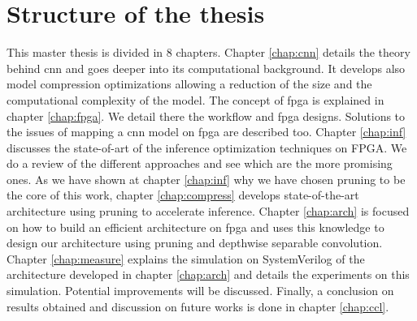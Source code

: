 \section*{Structure of the thesis}
This master thesis is divided in 8 chapters. \newline \newline
%
Chapter \ref{chap:cnn} details the theory behind \acrshort{cnn} and goes deeper into its computational background. It develops also model compression optimizations allowing a reduction of the size and the computational complexity of the model. \newline \newline
%
The concept of \acrshort{fpga} is explained in chapter \ref{chap:fpga}. We detail there the workflow and \acrshort{fpga} designs. Solutions to the issues of mapping a \acrshort{cnn} model on \acrshort{fpga} are described too. \newline \newline
%
Chapter \ref{chap:inf} discusses the state-of-art of the inference optimization techniques on FPGA. We do a review of the different approaches and see which are the more promising ones. \newline \newline
%
As we have shown at chapter \ref{chap:inf} why we have chosen pruning to be the core of this work, chapter \ref{chap:compress} develops state-of-the-art architecture using pruning to accelerate inference.
%
Chapter \ref{chap:arch} is focused on how to build an efficient architecture on \acrshort{fpga} and uses this knowledge to design our architecture using pruning and depthwise separable convolution.\newline \newline
%
Chapter \ref{chap:measure} explains the simulation on SystemVerilog of the architecture developed in chapter \ref{chap:arch} and details the experiments on this simulation. Potential improvements will be discussed.\newline \newline
%
Finally, a conclusion on results obtained and discussion on future works is done in chapter \ref{chap:ccl}.
\afterpage{\blankpage}
\cleardoublepage
\newpage
